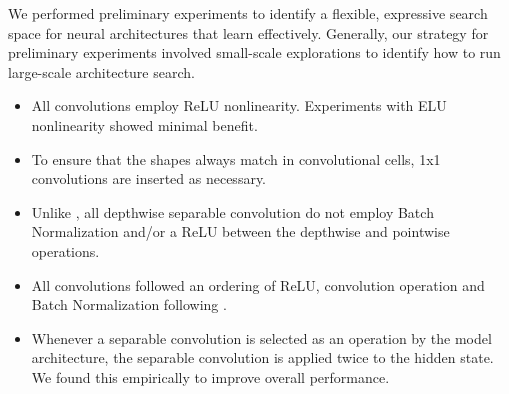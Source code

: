 \documentclass[10pt,twocolumn,letterpaper]{article}
\begin{document}
We performed preliminary experiments to identify a flexible, expressive search space for neural architectures that learn effectively. Generally, our strategy for preliminary experiments involved small-scale explorations to identify how to run large-scale architecture search.

\begin{itemize}
\item All convolutions employ ReLU nonlinearity. Experiments with ELU nonlinearity \cite{clevert2015fast} showed minimal benefit.
\item To ensure that the shapes always match in convolutional cells, 1x1 convolutions are inserted as necessary.
\item Unlike \cite{howard2017mobilenets}, all depthwise separable convolution do not employ Batch Normalization and/or a ReLU between the depthwise and pointwise operations.
\item All convolutions followed an ordering of ReLU, convolution operation and Batch Normalization following \cite{identity-mappings}.
\item Whenever a separable convolution is selected as an operation by the model architecture, the separable convolution is applied twice to the hidden state. We found this empirically to improve overall performance.

\end{itemize}
\end{document}
